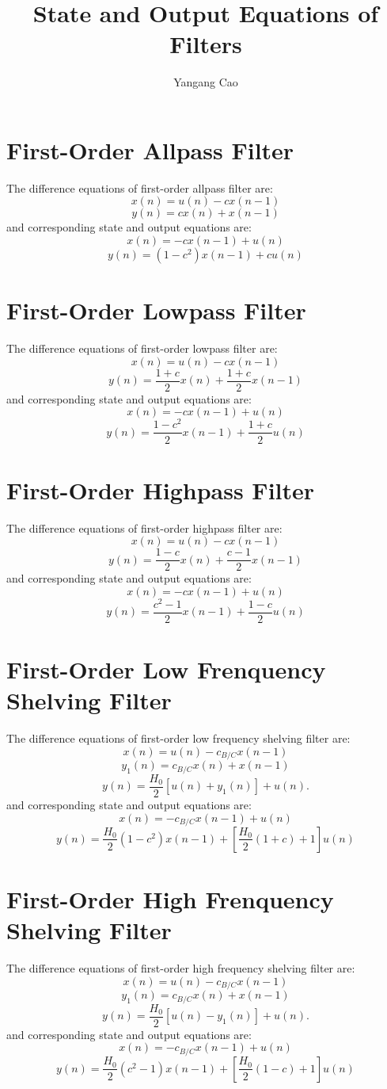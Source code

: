 \documentclass[10pt,a4paper,oneside]{article}
\author{Yangang Cao}
\begin{document}
\title{State and Output Equations of Filters}
\maketitle 
\section{First-Order Allpass Filter}
The difference equations of first-order allpass filter are: 
\[
x(n) = u(n) - cx(n-1)
\]
\[
y(n) = cx(n) + x(n-1)
\]
and corresponding state and output equations are:
\[
x(n) = -cx(n-1) +u(n)
\]
\[
y(n) = (1-c^2)x(n-1) + cu(n)
\]
\section{First-Order Lowpass Filter}
The difference equations of first-order lowpass filter are: 
\[
x(n) = u(n) - cx(n-1)
\]
\[
y(n) = \frac{1+c}{2}x(n) + \frac{1+c}{2}x(n-1)
\]
and corresponding state and output equations are:
\[
x(n) = -cx(n-1) +u(n)
\]
\[
y(n) = \frac{1-c^2}{2}x(n-1) + \frac{1+c}{2}u(n)
\]
\section{First-Order Highpass Filter}
The difference equations of first-order highpass filter are: 
\[
x(n) = u(n) - cx(n-1)
\]
\[
y(n) = \frac{1-c}{2}x(n) + \frac{c-1}{2}x(n-1)
\]
and corresponding state and output equations are:
\[
x(n) = -cx(n-1) +u(n)
\]
\[
y(n) = \frac{c^2-1}{2}x(n-1) + \frac{1-c}{2}u(n)
\]
\section{First-Order Low Frenquency Shelving Filter}
The difference equations of first-order low frequency shelving filter are: 
\[
x(n) = u(n) - c_{B/C}x(n-1)
\]
\[
y_1(n) = c_{B/C}x(n) + x(n-1)
\]
\[
y(n) = \frac{H_0}{2}[u(n) + y_1(n)] + u(n).
\]
and corresponding state and output equations are:
\[
x(n) = -c_{B/C}x(n-1) + u(n)
\]
\[
y(n) = \frac{H_0}{2}(1-c^2)x(n-1) + [\frac{H_0}{2}(1+c)+1]u(n)
\]
\section{First-Order High Frenquency Shelving Filter}
The difference equations of first-order high frequency shelving filter are: 
\[
x(n) = u(n) - c_{B/C}x(n-1)
\]
\[
y_1(n) = c_{B/C}x(n) + x(n-1)
\]
\[
y(n) = \frac{H_0}{2}[u(n) - y_1(n)] + u(n).
\]
and corresponding state and output equations are:
\[
x(n) = -c_{B/C}x(n-1) + u(n)
\]
\[
y(n) = \frac{H_0}{2}(c^2-1)x(n-1) + [\frac{H_0}{2}(1-c)+1]u(n)
\]
\end{document}
